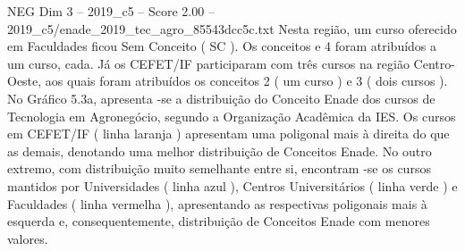 \begin{textsample}{NEG Dim 3 – 2019\_c5 – Score 2.00 – 2019\_c5/enade\_2019\_tec\_agro\_85543dcc5c.txt}
Nesta região, um curso oferecido em Faculdades ficou Sem Conceito ( SC ).
Os conceitos e 4 foram atribuídos a um curso, cada.
Já os CEFET/IF participaram com três cursos na região Centro-Oeste, aos quais foram atribuídos os conceitos 2 ( um curso ) e 3 ( dois cursos ).
No Gráfico 5.3a, apresenta -se a distribuição do Conceito Enade dos cursos de Tecnologia em Agronegócio, segundo a Organização Acadêmica da IES.
Os cursos em CEFET/IF ( linha laranja ) apresentam uma poligonal mais à direita do que as demais, denotando uma melhor distribuição de Conceitos Enade.
No outro extremo, com distribuição muito semelhante entre si, encontram -se os cursos mantidos por Universidades ( linha azul ), Centros Universitários ( linha verde ) e Faculdades ( linha vermelha ), apresentando as respectivas poligonais mais à esquerda e, consequentemente, distribuição de Conceitos Enade com menores valores.

\end{textsample}
